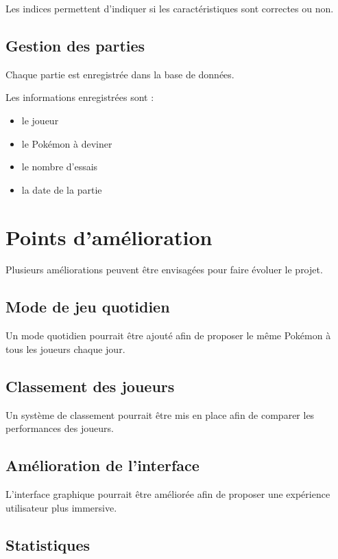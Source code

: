 \documentclass[a4paper,12pt]{article}
\begin{document}
    Les indices permettent d’indiquer si les caractéristiques sont correctes ou non.

    \subsection{Gestion des parties}

    Chaque partie est enregistrée dans la base de données.

    Les informations enregistrées sont :

    \begin{itemize}
        \item le joueur
        \item le Pokémon à deviner
        \item le nombre d'essais
        \item la date de la partie
    \end{itemize}

    \section{Points d'amélioration}

    Plusieurs améliorations peuvent être envisagées pour faire évoluer le projet.

    \subsection{Mode de jeu quotidien}

    Un mode quotidien pourrait être ajouté afin de proposer le même Pokémon à tous les joueurs chaque jour.

    \subsection{Classement des joueurs}

    Un système de classement pourrait être mis en place afin de comparer les performances des joueurs.

    \subsection{Amélioration de l'interface}

    L’interface graphique pourrait être améliorée afin de proposer une expérience utilisateur plus immersive.

    \subsection{Statistiques}
\end{document}
